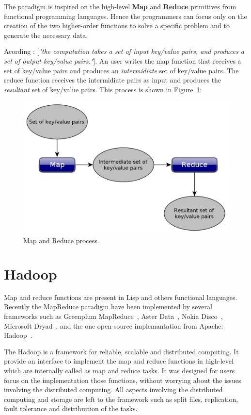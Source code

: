 The paradigm is inspired on the high-level \textbf{Map} and \textbf{Reduce} primitives
from functional programming languages. Hence the programmers can focus only on the
creation of the two higher-order functions to solve a specific problem and to generate
the necessary data.

Acording \cite{dean:2008}: [\textit{"the computation takes a set of input key/value pairs,
and produces a set of output key/value pairs."}]. An user writes the map function
that receives a set of key/value pairs and produces an \textit{intermidiate}
set of key/value pairs. The reduce function receives the intermidiate pairs as
input and produces the \textit{resultant} set of key/value pairs. This process is
shown in Figure~\ref{fig:mapReduce}:

\begin{figure}[htbp]
	\centering
	\includegraphics[width=\columnwidth]{img/mapReduce.jpg}
	\caption{Map and Reduce process.}\label{fig:mapReduce}
\end{figure}

\section{Hadoop}
Map and reduce functions are present in Lisp and others functional languages. Recently
the MapReduce paradigm have been implemented by several frameworks such as Greenplum
MapReduce~\cite{Greenplum:2008}, Aster Data~\cite{Aster:2011}, Nokia
Disco~\cite{Mundkur:2011}, Microsoft Dryad~\cite{Isard:2007}, and the one
open-source implemantation from Apache: Hadoop~\cite{hadoop}.

The Hadoop is a framework for reliable, scalable and distributed computing. It provide
an interface to implement the map and reduce functions in high-level which are internally
called as map and reduce tasks. It was designed for users focus on the implementation
those functions, without worrying about the issues involving the distributed computing.
All aspects involving the distributed computing and storage are left to the framework
such as split files, replication, fault tolerance and distribuition of the tasks.

